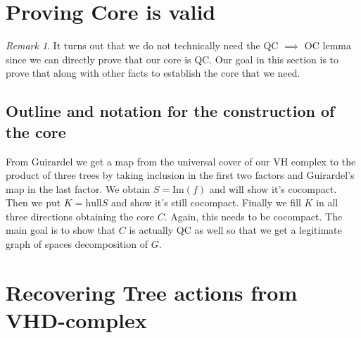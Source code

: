 \documentclass{article}
\theoremstyle{mystyle}
\theoremstyle{remark}
\newtheorem{rmk}{Remark}[section]
\begin{document}
\section{Proving Core is valid}

\begin{rmk}
	It turns out that we do not technically need the QC \(\implies\) OC lemma since we can directly prove that our core is QC. Our goal in this section is to prove that along with other facts to establish the core that we need.

\subsection{Outline and notation for the construction of the core}

	From Guirardel we get a map from the universal cover of our VH complex to the product of three trees by taking inclusion in the first two factors and Guirardel's map in the last factor. We obtain \(S = \text{Im}(f)\) and will show it's cocompact. Then we put \(K = \text{hull}{S}\) and show it's still cocompact. Finally we fill \(K\) in all three directions obtaining the core \(C\). Again, this needs to be cocompact. The main goal is to show that \(C\) is actually QC as well so that we get a legitimate graph of spaces decomposition of \(G\).
\end{rmk}

\section{Recovering Tree actions from VHD-complex}
\end{document}

